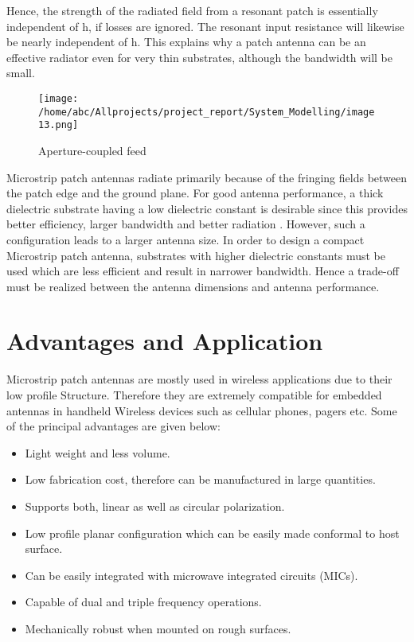 \documentclass[12pt]{article}
\begin{document}
					                 Hence,  the  strength  of  the  radiated  field  from  a resonant patch is  essentially independent  of  h,  if  losses are ignored. The resonant input resistance will  likewise  be  nearly  independent  of  h.  This  explains  why  a  patch  antenna  can  be  an  effective radiator even for very thin substrates, although the bandwidth will be small.
					                \begin{figure}[H]
					                	\centering
					                	\texttt{[image: /home/abc/Allprojects/project\_report/System\_Modelling/image13.png]}
					                	\caption{Aperture-coupled feed }	             	
					                \end{figure}
					                 Microstrip patch antennas radiate primarily because of the fringing fields between the patch edge and the ground plane. For good antenna performance, a thick dielectric substrate having a low dielectric constant is desirable since this provides better efficiency, larger bandwidth and better radiation . However, such a configuration leads to a larger antenna size. In order to design a compact Microstrip patch antenna, substrates with higher dielectric constants must be used which are less efficient and result in narrower bandwidth. Hence a trade-off must be realized between the antenna dimensions and antenna performance.
					                 
					                 \section{Advantages and Application}
					                  \justify
						                 Microstrip patch antennas are mostly used in wireless applications due to their low profile Structure. Therefore they are extremely compatible for embedded antennas in handheld Wireless devices such as cellular phones, pagers etc.
						                 Some of the principal advantages are given below:
						                 \begin{itemize}
						                 	\item Light weight and less volume.
						                 	\item Low fabrication cost, therefore can be manufactured in large quantities.
						                 	\item Supports both, linear as well as circular polarization.
						                 	\item Low profile planar configuration which can be easily made conformal to host surface.
						                 	\item Can be easily integrated with microwave integrated circuits (MICs).	
						                 	\item Capable of dual and triple frequency operations.
						                 	\item Mechanically robust when mounted on rough surfaces.
						                 \end{itemize}
						                
\end{document}
